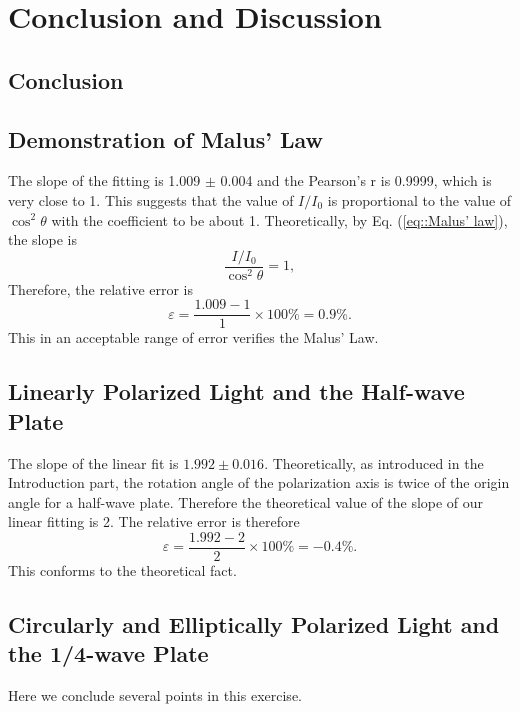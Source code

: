 \documentclass[a4paper]{article}
\begin{document}
\section{Conclusion and Discussion}

\subsection{Conclusion}

\subsection{Demonstration of Malus' Law}

The slope of the fitting is 1.009 $\pm$ 0.004 and the Pearson's r is 0.9999, which is very close to 1. This suggests that the value of $I/I_0$ is proportional to the value of $\cos^2\theta$ with the coefficient to be about 1. 
Theoretically, by Eq. (\ref{eq::Malus’ law}), the slope is
$$\frac{I/I_0}{\cos^2\theta} = 1,$$
Therefore, the relative error is
$$\varepsilon = \frac{1.009-1}{1} \times 100\% = 0.9\%.$$
This in an acceptable range of error verifies the Malus' Law.

\subsection{Linearly Polarized Light and the Half-wave Plate}

The slope of the linear fit is $1.992 \pm 0.016$. Theoretically, as introduced in the Introduction part, the rotation angle of the polarization axis is twice of the origin angle for a half-wave plate. 
Therefore the theoretical value of the slope of our linear fitting is 2. The relative error is therefore
$$\varepsilon = \frac{1.992-2}{2}\times 100\% = -0.4\%.$$ 
This conforms to the theoretical fact.

\subsection{Circularly and Elliptically Polarized Light and the 1/4-wave Plate}

Here we conclude several points in this exercise.
\end{document}
